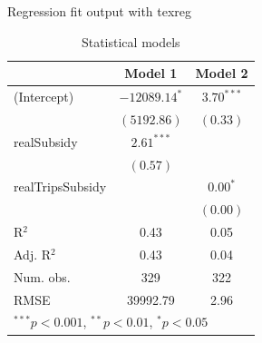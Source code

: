 \documentclass[12pt, a4paper, titlepage]{article}\usepackage[]{graphicx}\usepackage[]{color}
\begin{document}
% 
% 
% 




Regression fit output with texreg\\


\begin{table}
\begin{center}
\begin{tabular}{l c c }
\hline
 & Model 1 & Model 2 \\
\hline
(Intercept)      & $-12089.14^{*}$ & $3.70^{***}$ \\
                 & $(5192.86)$     & $(0.33)$     \\
realSubsidy      & $2.61^{***}$    &              \\
                 & $(0.57)$        &              \\
realTripsSubsidy &                 & $0.00^{*}$   \\
                 &                 & $(0.00)$     \\
\hline
R$^2$            & 0.43            & 0.05         \\
Adj. R$^2$       & 0.43            & 0.04         \\
Num. obs.        & 329             & 322          \\
RMSE             & 39992.79        & 2.96         \\
\hline
\multicolumn{3}{l}{\scriptsize{$^{***}p<0.001$, $^{**}p<0.01$, $^*p<0.05$}}
\end{tabular}
\caption{Statistical models}
\label{mealsTripsSubsidyRegressions}
\end{center}
\end{table}
\end{document}
